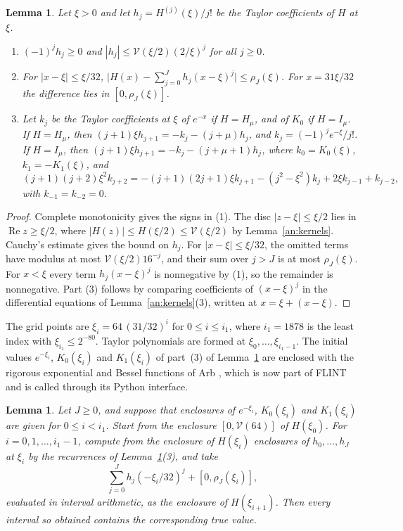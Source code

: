 \documentclass[11pt]{amsart}
\numberwithin{equation}{section}
\newtheorem{lemma}[equation]{Lemma}
\theoremstyle{definition}
\theoremstyle{remark}
\begin{document}
\begin{lemma}\label{an:taylor}
Let $\xi>0$ and let $h_j=H^{(j)}(\xi)/j!$ be the Taylor coefficients of $H$
at $\xi$.
\begin{enumerate}
\item $(-1)^jh_j\ge0$ and $|h_j|\le\mathcal V(\xi/2)(2/\xi)^j$ for all
 $j\ge0$.
\item For $|x-\xi|\le\xi/32$,
 $\bigl|H(x)-\sum_{j=0}^Jh_j(x-\xi)^j\bigr|\le\rho_J(\xi)$. For
 $x=31\xi/32$ the difference lies in $[0,\rho_J(\xi)]$.
\item Let $k_j$ be the Taylor coefficients at $\xi$ of $e^{-x}$ if
 $H=H_\mu$, and of $K_0$ if $H=I_\mu$. If $H=H_\mu$, then
 $(j+1)\xi h_{j+1}=-k_j-(j+\mu)h_j$, and $k_j=(-1)^je^{-\xi}/j!$. If
 $H=I_\mu$, then $(j+1)\xi h_{j+1}=-k_j-(j+\mu+1)h_j$, where
 $k_0=K_0(\xi)$, $k_1=-K_1(\xi)$, and
 \[
 (j+1)(j+2)\xi^2k_{j+2}=-(j+1)(2j+1)\xi k_{j+1}-(j^2-\xi^2)k_j
 +2\xi k_{j-1}+k_{j-2},
 \]
 with $k_{-1}=k_{-2}=0$.
\end{enumerate}
\end{lemma}

\begin{proof}
Complete monotonicity gives the signs in (1). The disc $|z-\xi|\le\xi/2$ lies
in $\operatorname{Re}z\ge\xi/2$, where $|H(z)|\le H(\xi/2)\le\mathcal
V(\xi/2)$ by Lemma~\ref{an:kernels}. Cauchy's estimate gives the bound on
$h_j$. For $|x-\xi|\le\xi/32$, the omitted terms have modulus at most
$\mathcal V(\xi/2)16^{-j}$, and their sum over $j>J$ is at most
$\rho_J(\xi)$. For $x<\xi$ every term $h_j(x-\xi)^j$ is nonnegative by (1),
so the remainder is nonnegative. Part (3) follows by comparing coefficients
of $(x-\xi)^j$ in the differential equations of Lemma~\ref{an:kernels}(3),
written at $x=\xi+(x-\xi)$.
\end{proof}

The grid points are $\xi_i=64\,(31/32)^i$ for $0\le i\le i_1$, where
$i_1=1878$ is the least index with $\xi_{i_1}\le2^{-80}$. Taylor polynomials
are formed at $\xi_0,\ldots,\xi_{i_1-1}$. The initial values
$e^{-\xi_i}$, $K_0(\xi_i)$ and $K_1(\xi_i)$ of part~(3) of
Lemma~\ref{an:taylor} are enclosed with the rigorous exponential and Bessel
functions of Arb \cite{Johansson2017}, which is now part of FLINT
\cite{FLINT} and is called through its Python interface.

\begin{lemma}\label{an:grid}
Let $J\ge0$, and suppose that enclosures of $e^{-\xi_i}$, $K_0(\xi_i)$ and
$K_1(\xi_i)$ are given for $0\le i<i_1$. Start from the enclosure
$[0,\mathcal V(64)]$ of $H(\xi_0)$. For $i=0,1,\ldots,i_1-1$, compute from
the enclosure of $H(\xi_i)$ enclosures of $h_0,\ldots,h_J$ at $\xi_i$ by the
recurrences of Lemma~\ref{an:taylor}(3), and take
\[
 \sum_{j=0}^Jh_j(-\xi_i/32)^j+[0,\rho_J(\xi_i)],
\]
evaluated in interval arithmetic, as the enclosure of $H(\xi_{i+1})$. Then
every interval so obtained contains the corresponding true value.
\end{lemma}
\end{document}

